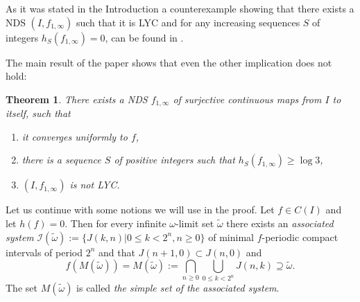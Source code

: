 \documentclass{amsart}
\newtheorem{theorem}{Theorem}
\begin{document}


As it was stated in the Introduction a counterexample showing that there exists a NDS $(I,f_{1,\infty})$ such that it is LYC and for any increasing sequences $S$ of integers $h_S(f_{1,\infty}) = 0$, can be found in \cite{Sot}.

The main result of the paper shows that even the other implication does not hold:



\begin{theorem}
\label{Main1}
There exists a NDS $f_{1,\infty}$ of surjective continuous maps from $I$ to itself, such that
\begin{enumerate}
\item it converges uniformly to $f$,
\item there is a sequence $S$ of positive integers such that $h_S(f_{1,\infty}) \geq \log 3$,
\item $(I,f_{1,\infty})$ is not LYC.
\end{enumerate}
\end{theorem}

Let us continue with some notions we will use in the proof. Let $f \in C(I)$ and let $h(f) = 0$. Then for every infinite $\omega$-limit set $\tilde{\omega}$ there exists an {\sl associated system} $\mathcal{I}(\tilde{\omega}) := \{J(k,n)| 0 \leq k < 2^n, n \geq 0\}$ of minimal $f$-periodic compact intervals of period $2^n$ and that $J(n+1,0) \subset J(n,0)$ and
\begin{equation}
\label{AssocSet}
f(M(\tilde{\omega})) = M(\tilde{\omega}) := \bigcap_{n\geq 0} \bigcup_{0\leq k < 2^n} J(n,k) \supseteq \tilde{\omega}.
\end{equation}
The set $M(\tilde{\omega})$ is called {\sl the simple set of the associated system}.
\end{document}
